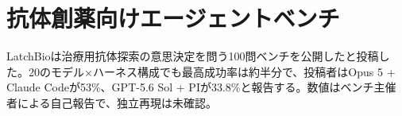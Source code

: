 \section{抗体創薬向けエージェントベンチ}
LatchBioは治療用抗体探索の意思決定を問う100問ベンチを公開したと投稿した。20のモデル×ハーネス構成でも最高成功率は約半分で、投稿者はOpus 5 + Claude Codeが53\%、GPT-5.6 Sol + PIが33.8\%と報告する。数値はベンチ主催者による自己報告で、独立再現は未確認。
